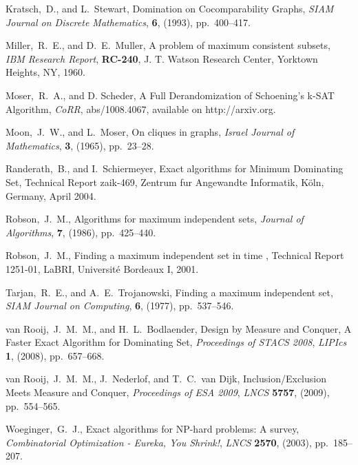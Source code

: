 \documentclass[a4paper,10pt]{article}
\theoremstyle{plain}
\theoremstyle{definition}
\theoremstyle{remark}
\begin{document}
\begin{thebibliography}{99}
Kratsch,~D., and L.~Stewart,
Domination on Cocomparability Graphs,
{\em SIAM Journal on Discrete Mathematics\/},
{\bf 6}, (1993), pp.~400--417.

 Miller,~R.~E., and D.~E.~Muller,
A problem of maximum consistent subsets,
{\em IBM Research Report},
{\bf RC-240}, J. T. Watson Research Center, Yorktown Heights, NY, 1960.

 Moser,~R.~A., and D. Scheder,
A Full Derandomization of Schoening's k-SAT Algorithm,
{\em CoRR},
{abs/1008.4067},
available on http://arxiv.org.

Moon,~J.~W., and L.~Moser,
On cliques in graphs,
{\em Israel Journal of Mathematics\/},
{\bf 3}, (1965), pp.~23--28.

Randerath,~B., and I.~Schiermeyer,
Exact algorithms for Minimum Dominating Set,
Technical Report zaik-469, Zentrum fur Angewandte Informatik,
K\"oln, Germany, April 2004.

Robson,~J.~M.,
Algorithms for maximum independent sets,
{\em Journal of Algorithms}, {\bf 7}, (1986), pp.~425--440.

Robson,~J.~M.,
Finding a maximum independent set in time ,
Technical Report 1251-01, LaBRI, Universit\'e Bordeaux I, 2001.



Tarjan,~R.~E., and A.~E.~Trojanowski,
Finding a maximum independent set,
{\em SIAM Journal on Computing\/},
{\bf 6}, (1977), pp.~537--546.

van Rooij,~J.~M.~M., and H.~L.~Bodlaender,
Design by Measure and Conquer, A Faster Exact Algorithm for Dominating Set,
{\em Proceedings of STACS 2008\/}, {\em LIPIcs\/}
{\bf 1}, (2008), pp.~657--668.

van Rooij,~J.~M.~M., J.~Nederlof, and T.~C.~van Dijk,
Inclusion/Exclusion Meets Measure and Conquer,
{\em Proceedings of ESA 2009\/}, {\em LNCS\/}
{\bf 5757}, (2009), pp.~554--565.


Woeginger,~G.~J.,
Exact algorithms for NP-hard problems: A survey,
{\em Combinatorial Optimization - Eureka, You Shrink!\/}, {\em LNCS\/}
{\bf 2570}, (2003), pp.~185--207.



\end{thebibliography}
\end{document}
